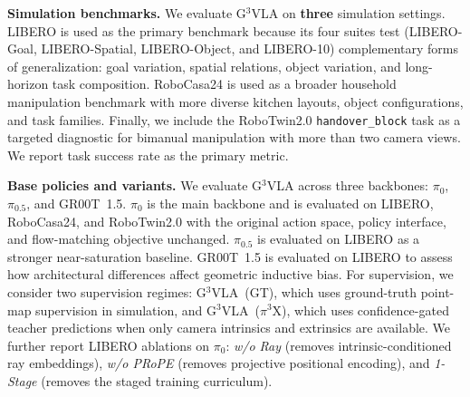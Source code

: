 \documentclass{article}
\begin{document}
\textbf{Simulation benchmarks.}
We evaluate G$^3$VLA on \textbf{three} simulation settings. LIBERO is used as the primary benchmark because its four suites test (LIBERO-Goal, LIBERO-Spatial, LIBERO-Object, and LIBERO-10) complementary forms of generalization: goal variation, spatial relations, object variation, and long-horizon task composition. RoboCasa24 is used as a broader household manipulation benchmark with more diverse kitchen layouts, object configurations, and task families. Finally, we include the RoboTwin2.0 \texttt{handover\_block} task as a targeted diagnostic for bimanual manipulation with more than two camera views. We report task success rate as the primary metric.

\textbf{Base policies and variants.}
We evaluate G$^3$VLA across three backbones: $\pi_0$, $\pi_{0.5}$, and GR00T~1.5. $\pi_0$ is the main backbone and is evaluated on LIBERO, RoboCasa24, and RoboTwin2.0 with the original action space, policy interface, and flow-matching objective unchanged. $\pi_{0.5}$ is evaluated on LIBERO as a stronger near-saturation baseline. GR00T~1.5 is evaluated on LIBERO to assess how architectural differences affect geometric inductive bias.
For supervision, we consider two supervision regimes: G$^3$VLA~(GT), which uses ground-truth point-map supervision in simulation, and G$^3$VLA~($\pi^3$X), which uses confidence-gated teacher predictions when only camera intrinsics and extrinsics are available. We further report LIBERO ablations on $\pi_0$: \textit{w/o Ray} (removes intrinsic-conditioned ray embeddings), \textit{w/o PRoPE} (removes projective positional encoding), and \textit{1-Stage} (removes the staged training curriculum).
\end{document}
